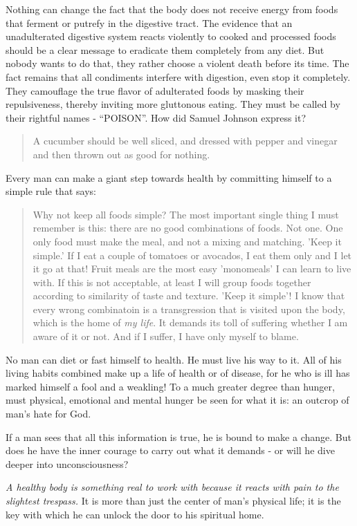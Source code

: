 \documentclass[12pt,letterpaper]{article}
\begin{document}
Nothing can change the fact that the body does not receive energy from
foods that ferment or putrefy in the digestive tract. The evidence
that an unadulterated digestive system reacts violently to cooked and
processed foods should be a clear message to eradicate them completely
from any diet. But nobody wants to do that, they rather choose a
violent death before its time. The fact remains that all condiments
interfere with digestion, even stop it completely. They camouflage the
true flavor of adulterated foods by masking their repulsiveness,
thereby inviting more gluttonous eating. They must be called by their
rightful names - ``POISON''. How did Samuel Johnson express it?
\begin{quote} A cucumber should be well sliced, and dressed with
pepper and vinegar and then thrown out as good for nothing.
\end{quote} Every man can make a giant step towards health by
committing himself to a simple rule that says:
\begin{quote} Why not keep all foods simple? The most important single
thing I must remember is this: there are no good combinations of
foods. Not one. One only food must make the meal, and not a mixing and
matching. 'Keep it simple.' If I eat a couple of tomatoes or avocados,
I eat them only and I let it go at that! Fruit meals are the most easy
'monomeals' I can learn to live with. If this is not acceptable, at
least I will group foods together according to similarity of taste and
texture. 'Keep it simple'! I know that every wrong combinatoin is a
transgression that is visited upon the body, which is the home of
\emph{my life}. It demands its toll of suffering whether I am aware of
it or not. And if I suffer, I have only myself to blame.
\end{quote}

No man can diet or fast himself to health. He must live his way to
it. All of his living habits combined make up a life of health or of
disease, for he who is ill has marked himself a fool and a weakling!
To a much greater degree than hunger, must physical, emotional and
mental hunger be seen for what it is: an outcrop of man's hate for
God.

If a man sees that all this information is true, he is bound to make a
change. But does he have the inner courage to carry out what it
demands - or will he dive deeper into unconsciousness?

\emph{A healthy body is something real to work with because it reacts
  with pain 
to the slightest trespass.} It is more than just the center of man's
physical life; it is the key with which he can unlock the door to his
spiritual home.
\end{document}
